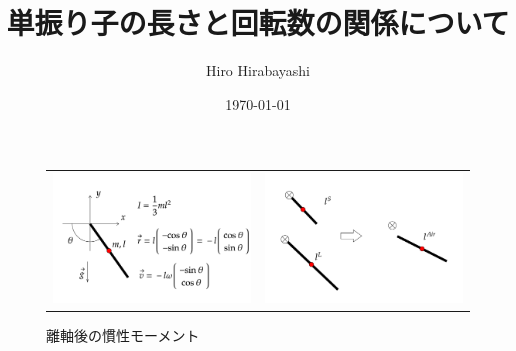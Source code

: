 \documentclass[a4paper,11pt]{jsarticle}
\begin{document}
\title{単振り子の長さと回転数の関係について}
\author{Hiro Hirabayashi}
\date{\today}
\maketitle

\begin{figure}[h]
  \begin{tabular}{cc}
    \begin{minipage}[t]{0.5\textwidth}
      \centering
      \includegraphics[width=1\textwidth]{config.png}
      \caption{設定}
      \label{config.png}
    \end{minipage} &
    \begin{minipage}[t]{0.5\textwidth}
      \centering
      \includegraphics[width=1\textwidth]{length_after_takeoff.png}
      \caption{離軸後の慣性モーメント}
      \label{length_after_takeoff.png}
    \end{minipage}
  \end{tabular}
\end{figure}
\end{document}
